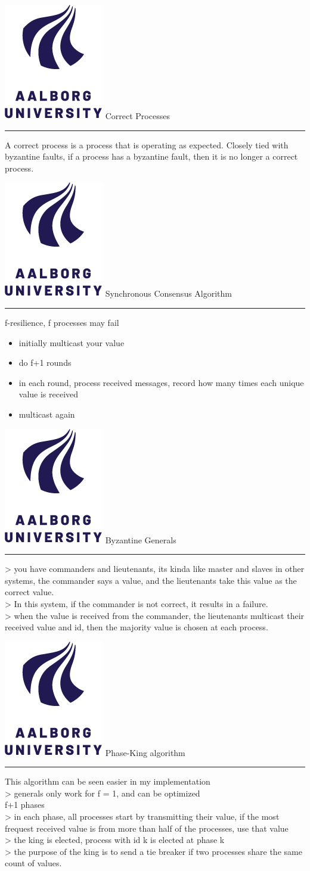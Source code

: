 \documentclass[aspectratio=1610,17pt,utf8]{beamer}
\newcommand{\regularframe}[1]{\color{black}\includegraphics[width=.05\textwidth]{figures/aau.png} #1\\\hrule}
\begin{document}
\begin{frame}{\regularframe{Correct Processes}}
    A correct process is a process that is operating as expected. Closely tied with byzantine faults, if a process has a byzantine fault, then it is no longer a correct process.
\end{frame}

\begin{frame}{\regularframe{Synchronous Consensus Algorithm}}
    f-resilience, f processes may fail
    \begin{itemize}
        \item initially multicast your value
        \item do f+1 rounds
        \item in each round, process received messages, record how many times each unique value is received
        \item multicast again
    \end{itemize}
\end{frame}

\begin{frame}{\regularframe{Byzantine Generals}}
    > you have commanders and lieutenants, its kinda like master and slaves in other systems, the commander says a value, and the lieutenants take this value as the correct value.\\
    > In this system, if the commander is not correct, it results in a failure.\\
    > when the value is received from the commander, the lieutenants multicast their received value and id, then the majority value is chosen at each process.
\end{frame}

\begin{frame}{\regularframe{Phase-King algorithm}}
    This algorithm can be seen easier in my implementation\\
    > generals only work for f = 1, and can be optimized\\
    f+1 phases\\
    > in each phase, all processes start by transmitting their value, if the most frequest received value is from more than half of the processes, use that value\\
    > the king is elected, process with id k is elected at phase k\\
    > the purpose of the king is to send a tie breaker if two processes share the same count of values.
\end{frame}
\end{document}
